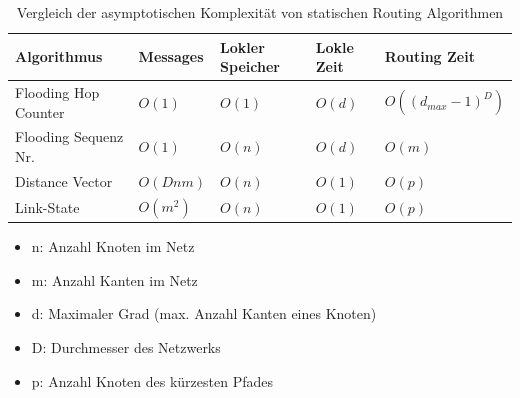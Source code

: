 \begin{table}[H]
	\centering
		\begin{tabular}{p{} p{} p{} 		   p{}       p{}} \toprule
            \textbf{Algorithmus} & \textbf{Messages} 	& \textbf{Lokler Speicher} & \textbf{Lokle Zeit}  & \textbf{Routing Zeit} \\ \midrule
			Flooding Hop Counter & $O(1)$      			& $O(1)$ 				   & $O(d)$ 			  & $O((d_{max}-1)^{D})$  \\ \midrule
			Flooding Sequenz Nr. & $O(1)$      			& $O(n)$ 				   & $O(d)$ 			  & $O(m)$  			  \\ \midrule
			Distance Vector		 & $O(Dnm)$    			& $O(n)$ 				   & $O(1)$ 			  & $O(p)$  \\ \midrule
			Link-State			 & $O(m^{2})$  			& $O(n)$ 				   & $O(1)$ 			  & $O(p)$  \\ \midrule
		\end{tabular}
	\caption{Vergleich der asymptotischen Komplexität von statischen Routing Algorithmen \cite{goodrich2006algorithm}}
	\label{tab:diff_routing}
\end{table}

\begin{itemize}
	\item n: Anzahl Knoten im Netz
	\item m: Anzahl Kanten im Netz
    \item d: Maximaler Grad (max. Anzahl Kanten eines Knoten)
    \item D: Durchmesser des Netzwerks
    \item p: Anzahl Knoten des kürzesten Pfades
\end{itemize}
